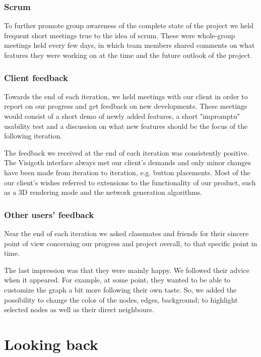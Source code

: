 \documentclass[a4paper,11pt,titlepage]{article}
\let\stdsection\section         %
\renewcommand{\section}{\newpage\stdsection}
\begin{document}
\subsubsection{Scrum}
To further promote group awareness of the complete state of the
project we held frequent short meetings true to the idea of scrum.
These were whole-group meetings held every few days, in which team
members shared comments on what features they were working on at
the time and the future outlook of the project.

\subsubsection{Client feedback}
Towards the end of each iteration, we held meetings with our client
in order to report on our progress and get feedback on new
developments. These meetings would consist of a short demo of newly
added features, a short "impromptu" usability test and a discussion
on what new features should be the focus of the following iteration.

The feedback we received at the end of each iteration was
consistently positive. The Visigoth interface always met our
client's demands and only minor changes have been made from
iteration to iteration, e.g. button placements. Most of the our
client's wishes referred to extensions to the functionality of
our product, such as a 3D rendering mode and the network generation
algorithms.


\subsubsection{Other users' feedback}
Near the end of each iteration we asked classmates and friends for
their sincere point of view concerning our progress and project
overall, to that specific point in time.

The last impression was that they were mainly happy. We followed their
advice when it appeared. For example, at some point, they wanted to be
able to customize the graph a bit more following their own taste. So,
we added the possibility to change the color of the nodes, edges,
background; to highlight selected nodes as well as their direct
neighbours.



\section{Looking back}
\end{document}
